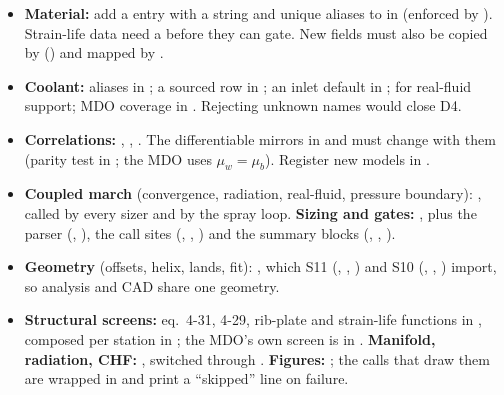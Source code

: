 \begin{itemize}
\item \textbf{Material:} add a  entry with a  string and unique aliases to  in  (enforced by ). Strain-life data need a  before they can gate. New fields must also be copied by  () and mapped by .
\item \textbf{Coolant:} aliases in ; a sourced row in ; an inlet default in ;  for real-fluid support; MDO coverage in . Rejecting unknown names would close D4.
\item \textbf{Correlations:} , , . The differentiable mirrors in  and  must change with them (parity test in ; the MDO uses $\mu_w = \mu_b$). Register new models in .
\item \textbf{Coupled march} (convergence, radiation, real-fluid, pressure boundary): , called by every sizer and by the spray loop. \textbf{Sizing and gates:} , plus the parser (, ), the call sites (, , ) and the summary blocks (, , ).
\item \textbf{Geometry} (offsets, helix, lands, fit): , which S11 (, , ) and S10 (, , ) import, so analysis and CAD share one geometry.
\item \textbf{Structural screens:} eq.\ 4-31, 4-29, rib-plate and strain-life functions in , composed per station in ; the MDO's own screen is in . \textbf{Manifold, radiation, CHF:} , switched through . \textbf{Figures:} ; the  calls that draw them are wrapped in  and print a ``skipped'' line on failure.
\end{itemize}

